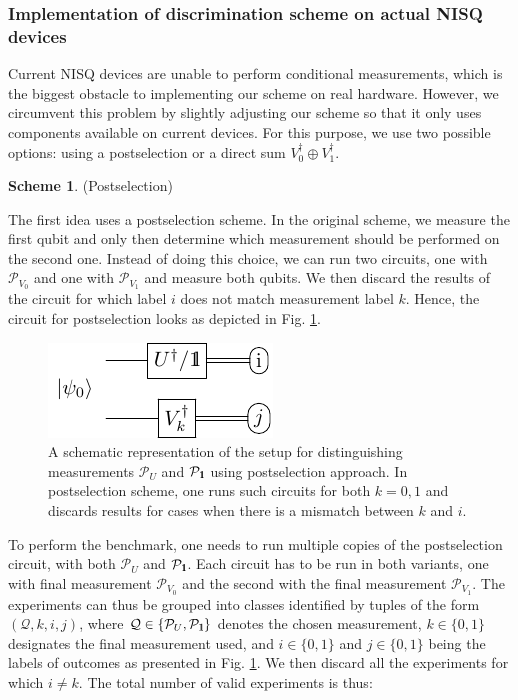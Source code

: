 \documentclass[preprint,12pt, a4paper, dvipsnames]{elsarticle}
\newcommand{\1}{{\rm 1\hspace{-0.9mm}l}}
\newcommand{\Id}{{\rm 1\hspace{-0.9mm}l}}
\newcommand{\PP}{\mathcal{P}}
\theoremstyle{definition}
\newtheorem{scheme}{Scheme}
\begin{document}
\subsubsection{Implementation of discrimination scheme on actual NISQ devices}

Current NISQ devices are unable to perform conditional measurements, which is the biggest
obstacle to implementing our scheme on real hardware. However, we circumvent this problem by
slightly adjusting our scheme so that it only uses components available on current devices.
For this purpose, we use two possible options: using a postselection or a direct sum $V_0^\dagger\oplus V_1^\dagger$.

\begin{scheme}(Postselection)

	The first idea uses a postselection scheme. In the original scheme, we measure the first qubit
	and only then determine which measurement should be performed on the second one. Instead of
	doing this choice, we can run two circuits, one with $\PP_{V_0}$ and one with $\PP_{V_1}$ and
	measure both qubits. We then discard the results of the circuit for which label $i$ does not match
	measurement label $k$. Hence, the circuit for postselection looks as depicted in Fig.
	\ref{fig:postselection}.

	\begin{figure}[h!]
		\centering
		\includegraphics[scale=1.7]{pics/postselection_no_channels}

		\caption{
			A schematic representation of the setup for distinguishing
			measurements $\PP_{U}$ and $\PP_{\Id}$ using postselection approach.
			In postselection scheme, one runs such circuits for both $k=0,1$ and discards results for cases when there is a mismatch between $k$ and $i$.
		}\label{fig:postselection}
	\end{figure}


	To perform the benchmark, one needs to run multiple copies of the postselection circuit,
	with both $\PP_U$ and $\PP_\1$. Each circuit has to be run in both variants, one with final
	measurement $\PP_{V_0}$ and the second with the final measurement $\PP_{V_1}$.
	The experiments can thus be grouped into classes identified by tuples of the form
	$(\mathcal{Q}, k, i, j)$, where $\mathcal{Q} \in \{\PP_U, \PP_\Id\}$ denotes the chosen
	measurement, $k \in \{0,1\}$ designates the final measurement used, and $i \in \{0,1\}$ and $j
	\in \{0,1\}$ being the labels of outcomes as presented in Fig. \ref{fig:postselection}.
	We then discard all the experiments for which $i \ne k$. The total number of valid experiments
	is thus:


\end{scheme}
\end{document}
